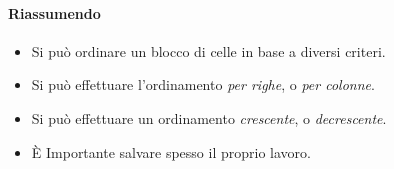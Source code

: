 
\paragraph{Riassumendo}

\begin{itemize} [nosep]
\item Si può ordinare un blocco di celle in base a diversi criteri.
\item Si può effettuare l'ordinamento \emph{per righe}, o \emph{per colonne}.
\item Si può effettuare un ordinamento \emph{crescente}, o 
\emph{decrescente}.
\item È Importante salvare spesso il proprio lavoro.
\end{itemize}

